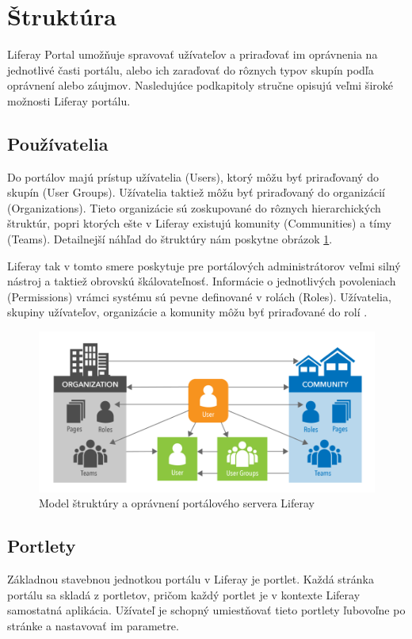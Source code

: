 \documentclass[
  digital, %
  twoside, %
  notable,   %
  nolof,   %
  nolot,   %
]{fithesis3}
\begin{document}
\section{Štruktúra}
Liferay Portal umožňuje spravovať užívateľov a priraďovať im oprávnenia na jednotlivé časti portálu, alebo ich zaraďovať do rôznych typov skupín podľa oprávnení alebo záujmov. Nasledujúce podkapitoly stručne opisujú veľmi široké možnosti Liferay portálu.

\subsection{Používatelia}
\label{liferay_users}
Do portálov majú prístup užívatelia (Users), ktorý môžu byť priraďovaný do skupín (User Groups). Užívatelia taktiež môžu byť priraďovaný do organizácií (Organizations). Tieto organizácie sú zoskupované do rôznych hierarchických štruktúr, popri ktorých ešte v Liferay existujú komunity (Communities) a tímy (Teams). Detailnejší náhľad do štruktúry nám poskytne obrázok \ref{liferay_structure}.

Liferay tak v tomto smere poskytuje pre portálových administrátorov veľmi silný nástroj a taktiež obrovskú škálovateľnosť. Informácie o jednotlivých povoleniach (Permissions) vrámci systému sú pevne definované v rolách (Roles). Užívatelia, skupiny užívateľov, organizácie a komunity môžu byť priraďované do rolí \cite{sezov2010portal}.

\begin{figure}[H]
	\center
	\includegraphics[width=1.0\linewidth]{liferay_structure}
	\caption{Model štruktúry a oprávnení portálového servera Liferay \cite{sezov2010portal}}
	\label{liferay_structure}
\end{figure}

\subsection{Portlety}
\label{portlets}
Základnou stavebnou jednotkou portálu v Liferay je portlet. Každá stránka portálu sa skladá z portletov, pričom každý portlet je v kontexte Liferay samostatná aplikácia. Užívateľ je schopný umiestňovať tieto portlety ľubovoľne po stránke a nastavovať im parametre.
\end{document}

